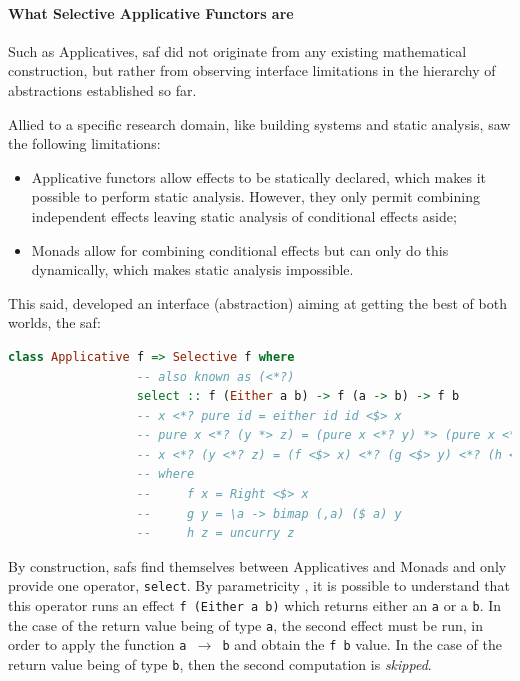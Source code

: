 \documentclass[
  oneside,
  11pt, a4paper,
  footinclude=true,
  headinclude=true,
  cleardoublepage=empty
]{scrbook}
\theoremstyle{definition}
\theoremstyle{definition}
\begin{document}
	        \paragraph{What Selective Applicative Functors are}
	       
	Such as Applicatives, \gls{saf} did not originate from any existing mathematical construction, but rather from observing interface limitations in the hierarchy of abstractions established so far.
	            
	Allied to a specific research domain, like building systems and static analysis, \cite{andrey2019selective} saw the following limitations:
	            
	            \begin{itemize}
	                \item Applicative functors allow effects to be statically declared, which makes it possible to perform static analysis. However, they only permit combining independent effects leaving static analysis of conditional effects aside;
	                \item Monads allow for combining conditional effects but can only do this dynamically, which makes static analysis impossible.
	            \end{itemize}{}
	            
	This said, \cite{andrey2019selective} developed an interface (abstraction) aiming at getting the best of both worlds, the \gls{saf}:
	            
	\begin{lstlisting}[language=Haskell, label={lst:saf}, caption={Selective Applicative Functor laws},captionpos=b]
	          class Applicative f => Selective f where
	              -- also known as (<*?)
	              select :: f (Either a b) -> f (a -> b) -> f b
	              -- x <*? pure id = either id id <$> x
	              -- pure x <*? (y *> z) = (pure x <*? y) *> (pure x <*? z)
	              -- x <*? (y <*? z) = (f <$> x) <*? (g <$> y) <*? (h <$> z)
                  -- where
                  --     f x = Right <$> x
                  --     g y = \a -> bimap (,a) ($ a) y
                  --     h z = uncurry z
	\end{lstlisting}{}
	            
	By construction, \glspl{saf} find themselves between Applicatives and Monads and only provide one operator, \texttt{select}. By parametricity \citep{Wadler:1989:TF:99370.99404}, it is possible to understand that this operator runs an effect \texttt{f (Either a b)} which returns either an \texttt{a} or a \texttt{b}. In the case of the return value being of type \texttt{a}, the second effect must be run, in order to apply the function \texttt{a $\rightarrow$ b} and obtain the \texttt{f b} value. In the case of the return value being of type \texttt{b}, then the second computation is \emph{skipped}.
	            
\end{document}
